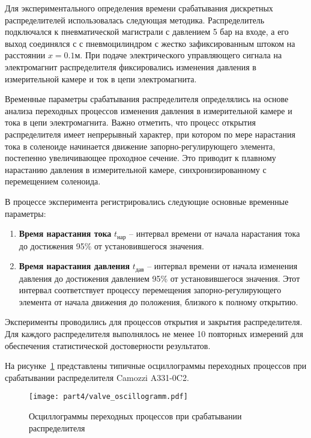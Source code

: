 Для экспериментального определения времени срабатывания дискретных распределителей использовалась следующая методика.
Распределитель подключался к пневматической магистрали с давлением 5 бар на входе,
а его выход соединялся с с пневмоцилиндром с жестко зафиксированным штоком на расстоянии $x=\num{0.1}\text{м}$.
При подаче электрического управляющего сигнала на электромагнит распределителя
фиксировались изменения давления в измерительной камере и ток в цепи электромагнита.

Временные параметры срабатывания распределителя определялись на основе анализа переходных процессов изменения
давления в измерительной камере и тока в цепи электромагнита. Важно отметить, что процесс открытия
распределителя имеет непрерывный характер, при котором по мере нарастания тока в соленоиде начинается
движение запорно-регулирующего элемента, постепенно увеличивающее проходное сечение. Это приводит к плавному
нарастанию давления в измерительной камере, синхронизированному с перемещением соленоида.

В процессе эксперимента регистрировались следующие основные временные параметры:
\begin{enumerate}
	\item \textbf{Время нарастания тока} $t_{\text{нар}}$ -- интервал времени от
	      начала нарастания тока до достижения 95\% от установившегося значения.

	\item \textbf{Время нарастания давления} $t_{\text{дав}}$ -- интервал времени от
	      начала изменения давления до достижения давлением 95\% от установившегося значения.
	      Этот интервал соответствует процессу перемещения запорно-регулирующего элемента от начала движения до положения, близкого к полному открытию.

\end{enumerate}

Эксперименты проводились для процессов открытия и закрытия распределителя. Для каждого распределителя
выполнялось не менее 10 повторных измерений для обеспечения статистической достоверности результатов.

На рисунке~\ref{fig} представлены типичные осциллограммы переходных процессов при срабатывании распределителя Camozzi A331-0C2.
\begin{figure}[ht]
	\centering
	\texttt{[image: part4/valve\_oscillogramm.pdf]}
	\caption{Осциллограммы переходных процессов при срабатывании распределителя}
	\label{fig}
\end{figure}

